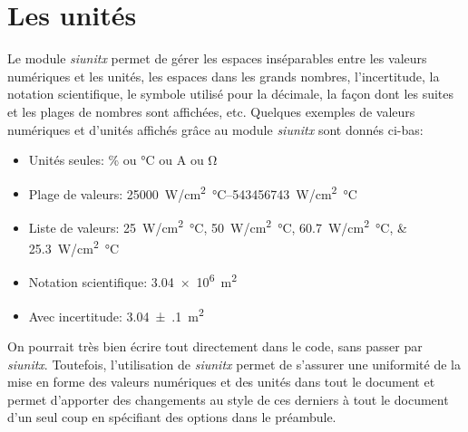 \documentclass[../exemple_master.tex]{subfiles}
\begin{document}
\section{Les unités}

Le module \emph{siunitx} permet de gérer les espaces inséparables entre les valeurs numériques et les unités, les espaces dans les grands nombres, l'incertitude, la notation scientifique, le symbole utilisé pour la décimale, la façon dont les suites et les plages de nombres sont affichées, etc. Quelques exemples de valeurs numériques et d'unités affichés grâce au module \emph{siunitx} sont donnés ci-bas: 

\begin{itemize}
\item Unités seules: \si{\percent} ou \si{\celsius} ou \si{\ampere} ou \si{\ohm}
\item Plage de valeurs: \SIrange{25000}{543456743}{W/cm^2 \celsius}
\item Liste de valeurs: \SIlist{25;50;60.7;25.3}{W/cm^2 \celsius}
\item Notation scientifique: \SI{3.04e6}{m^2}
\item Avec incertitude: \SI{3.04(10)}{m^2}
\end{itemize}

On pourrait très bien écrire tout directement dans le code, sans passer par \emph{siunitx}. Toutefois, l'utilisation de \emph{siunitx} permet de s'assurer une uniformité de la mise en forme des valeurs numériques et des unités dans tout le document et permet d'apporter des changements au style de ces derniers à tout le document d'un seul coup en spécifiant des options dans le préambule.
\end{document}
